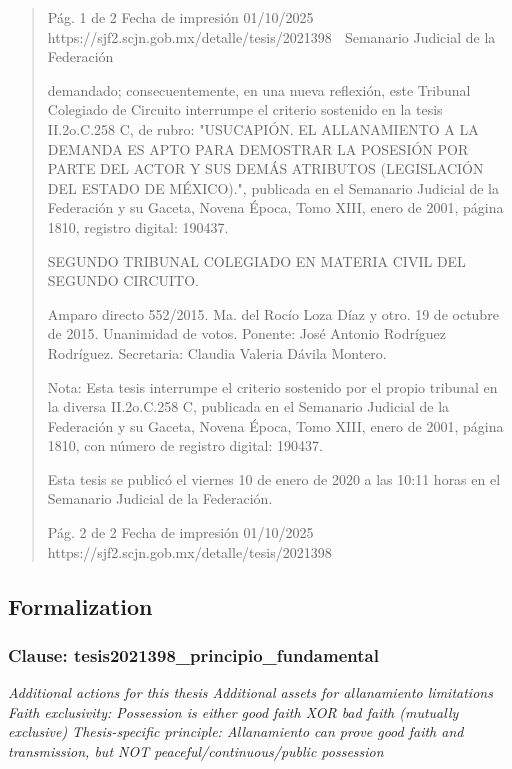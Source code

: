 \documentclass[11pt,a4paper]{article}
\begin{document}
\begin{quote}
                                              Pág. 1 de 2             Fecha de impresión 01/10/2025
  https://sjf2.scjn.gob.mx/detalle/tesis/2021398
                                                  Semanario Judicial de la Federación

demandado; consecuentemente, en una nueva reflexión, este Tribunal Colegiado de Circuito
interrumpe el criterio sostenido en la tesis II.2o.C.258 C, de rubro: "USUCAPIÓN. EL
ALLANAMIENTO A LA DEMANDA ES APTO PARA DEMOSTRAR LA POSESIÓN POR PARTE
DEL ACTOR Y SUS DEMÁS ATRIBUTOS (LEGISLACIÓN DEL ESTADO DE MÉXICO).", publicada
en el Semanario Judicial de la Federación y su Gaceta, Novena Época, Tomo XIII, enero de 2001,
página 1810, registro digital: 190437.

SEGUNDO TRIBUNAL COLEGIADO EN MATERIA CIVIL DEL SEGUNDO CIRCUITO.


Amparo directo 552/2015. Ma. del Rocío Loza Díaz y otro. 19 de octubre de 2015. Unanimidad de
votos. Ponente: José Antonio Rodríguez Rodríguez. Secretaria: Claudia Valeria Dávila Montero.

Nota: Esta tesis interrumpe el criterio sostenido por el propio tribunal en la diversa II.2o.C.258 C,
publicada en el Semanario Judicial de la Federación y su Gaceta, Novena Época, Tomo XIII, enero
de 2001, página 1810, con número de registro digital: 190437.


Esta tesis se publicó el viernes 10 de enero de 2020 a las 10:11 horas en el Semanario Judicial de
la Federación.




                                             Pág. 2 de 2            Fecha de impresión 01/10/2025
 https://sjf2.scjn.gob.mx/detalle/tesis/2021398

\end{quote}

\subsection{Formalization}

\subsubsection{Clause: tesis2021398\_principio\_fundamental}

\textit{Additional actions for this thesis Additional assets for allanamiento limitations Faith exclusivity: Possession is either good faith XOR bad faith (mutually exclusive) Thesis-specific principle: Allanamiento can prove good faith and transmission, but NOT peaceful/continuous/public possession}
\end{document}
